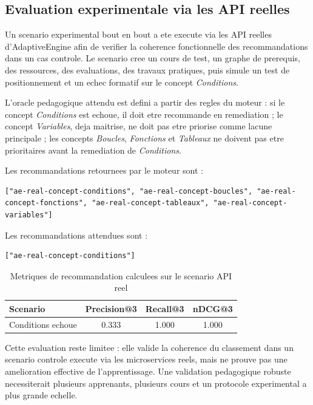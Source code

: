 \subsection{Evaluation experimentale via les API reelles}

Un scenario experimental bout en bout a ete execute via les API reelles
d'AdaptiveEngine afin de verifier la coherence fonctionnelle des recommandations
dans un cas controle. Le scenario cree un cours de test, un graphe de prerequis,
des ressources, des evaluations, des travaux pratiques, puis simule un test de
positionnement et un echec formatif sur le concept \textit{Conditions}.

L'oracle pedagogique attendu est defini a partir des regles du moteur : si le
concept \textit{Conditions} est echoue, il doit etre recommande en remediation ;
le concept \textit{Variables}, deja maitrise, ne doit pas etre priorise comme
lacune principale ; les concepts \textit{Boucles}, \textit{Fonctions} et
\textit{Tableaux} ne doivent pas etre prioritaires avant la remediation de
\textit{Conditions}.

Les recommandations retournees par le moteur sont :
\begin{verbatim}
["ae-real-concept-conditions", "ae-real-concept-boucles", "ae-real-concept-fonctions", "ae-real-concept-tableaux", "ae-real-concept-variables"]
\end{verbatim}

Les recommandations attendues sont :
\begin{verbatim}
["ae-real-concept-conditions"]
\end{verbatim}

\begin{table}[H]
\centering
\caption{Metriques de recommandation calculees sur le scenario API reel}
\begin{tabular}{lccc}
\hline
Scenario & Precision@3 & Recall@3 & nDCG@3 \\
\hline
Conditions echoue & 0.333 & 1.000 & 1.000 \\
\hline
\end{tabular}
\end{table}

Cette evaluation reste limitee : elle valide la coherence du classement dans un
scenario controle execute via les microservices reels, mais ne prouve pas une
amelioration effective de l'apprentissage. Une validation pedagogique robuste
necessiterait plusieurs apprenants, plusieurs cours et un protocole experimental
a plus grande echelle.
